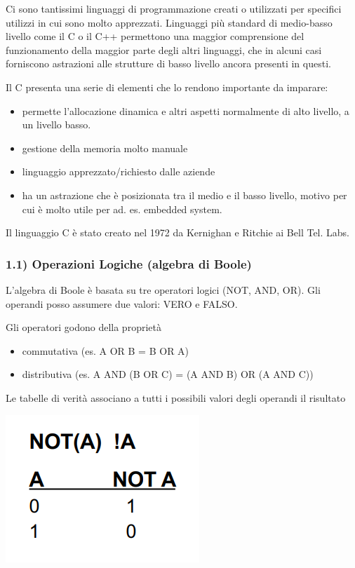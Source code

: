 \documentclass[
  paper=a4,
  oneside  ,captions=tableheading
]{scrbook}
\providecommand{\tightlist}{%
  \setlength{\itemsep}{0pt}\setlength{\parskip}{0pt}}
\begin{document}
Ci sono tantissimi linguaggi di programmazione creati o utilizzati per
specifici utilizzi in cui sono molto apprezzati. Linguaggi più standard
di medio-basso livello come il C o il C++ permettono una maggior
comprensione del funzionamento della maggior parte degli altri
linguaggi, che in alcuni casi forniscono astrazioni alle strutture di
basso livello ancora presenti in questi.

Il C presenta una serie di elementi che lo rendono importante da
imparare:

\begin{itemize}
\tightlist
\item
  permette l'allocazione dinamica e altri aspetti normalmente di alto
  livello, a un livello basso.
\item
  gestione della memoria molto manuale
\item
  linguaggio apprezzato/richiesto dalle aziende
\item
  ha un astrazione che è posizionata tra il medio e il basso livello,
  motivo per cui è molto utile per ad. es. embedded system.
\end{itemize}

Il linguaggio C è stato creato nel 1972 da Kernighan e Ritchie ai Bell
Tel. Labs.

\hypertarget{operazioni-logiche-algebra-di-boole}{%
\subsubsection{1.1) Operazioni Logiche (algebra di
Boole)}\label{operazioni-logiche-algebra-di-boole}}

L'algebra di Boole è basata su tre operatori logici (NOT, AND, OR). Gli
operandi posso assumere due valori: VERO e FALSO.

Gli operatori godono della proprietà

\begin{itemize}
\tightlist
\item
  commutativa (es. A OR B = B OR A)
\item
  distributiva (es. A AND (B OR C) = (A AND B) OR (A AND C))
\end{itemize}

Le tabelle di verità associano a tutti i possibili valori degli operandi
il risultato

\includegraphics{./image/image-20201207220212631-1607774144622.png}
\end{document}
